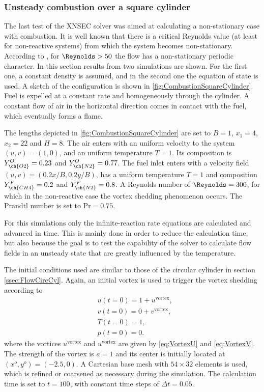 \subsubsection{Unsteady combustion over a square cylinder}
The last test of the XNSEC solver was aimed at calculating a non-stationary case with combustion. It is well known that there is a critical Reynolds value (at least for non-reactive systems) from which the system becomes non-stationary. According to \cite{sharmaHEATFLUIDFLOW2004}, for $\Reynolds > 50$ the flow has a non-stationary periodic character. In this section results from two simulations are shown. For the first one, a constant density is assumed, and in the second one the equation of state is used. 
A sketch of the configuration is shown in \cref{fig:CombustionSquareCylinder}. Fuel is expelled at a constant rate and homogeneously through the cylinder. A constant flow of air in the horizontal direction comes in contact with the fuel, which eventually forms a flame.

The lengths depicted in \cref{fig:CombustionSquareCylinder} are set to $B = 1$, $x_1 = 4$, $x_2 = 22$ and $H = 8$. The air enters with an uniform velocity to the system $(u,v) =(1,0)$, and an uniform temperature $T = 1$. Its composition is $Y^O_{\ch{O2}} = 0.23$ and $Y^O_{\ch{N2}} = 0.77$. The fuel inlet enters with a velocity field $(u,v) = (0.2x/B,0.2y/B)$, has a uniform temperature $T = 1$ and composition $Y^F_{\ch{CH4}} = 0.2$ and $Y^F_{\ch{N2}} = 0.8$. A Reynolds number of $\Reynolds = 300$, for which in the non-reactive case the vortex shedding phenomenon occurs. The Prandtl number is set to $\text{Pr} = 0.75$. 

For this simulations only the infinite-reaction rate equations are calculated and advanced in time. This is mainly done in order to reduce the calculation time, but also because the goal is to test the capability of the solver to calculate flow fields in an unsteady state that are greatly influenced by the temperature.  

The initial conditions used are similar to those of the circular cylinder in section \cref{ssec:FlowCircCyl}. Again, an initial vortex is used to trigger the vortex shedding according to
\begin{subequations} 
	\begin{align}
		&u(t=0) = 1 + u^{\text{vortex}},  \\
		&v(t=0) = 0 + v^{\text{vortex}},  \\
		&T(t=0) = 1,\\
		&p(t=0) = 0.
	\end{align}
\end{subequations}
where the vortices $u^{\text{vortex}}$ and $u^{\text{vortex}}$ are given by \cref{eq:VortexU} and \cref{eq:VortexV}. The strength of the vortex is $a=1$ and its center is initially located at $(x^o,y^o) = (-2.5, 0)$. A Cartesian base mesh with $54\times32$ elements is used, which is refined or coarsened as necessary during the simulation. The calculation time is set to $t = 100$, with constant time steps of $\Delta t = 0.05$. 

